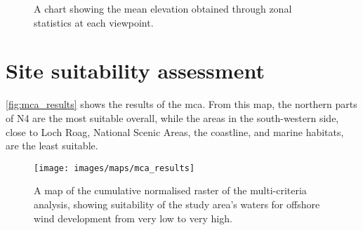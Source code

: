 \begin{figure}
  \centering
  \caption{A chart showing the mean elevation obtained through zonal statistics
  at each viewpoint. \label{fig:zs_elevation}}
\end{figure}

\section{Site suitability assessment}

\autoref{fig:mca_results} shows the results of the \gls{mca}. From this map,
the northern parts of N4 are the most suitable overall, while the areas in the
south-western side, close to Loch Roag, National Scenic Areas, the coastline,
and marine habitats, are the least suitable.

\begin{figure}
  \centering
  \texttt{[image: images/maps/mca\_results]}
  \caption{A map of the cumulative normalised raster of the multi-criteria
  analysis, showing suitability of the study area's waters for
  offshore wind development from very low to very high. \label{fig:mca_results}}
\end{figure}
